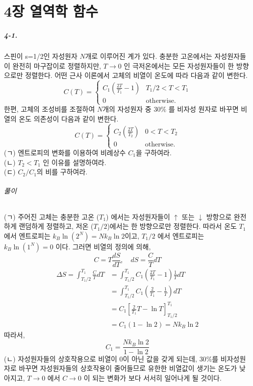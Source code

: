 \documentclass[a4paper,12pt]{report}
\begin{document}
	\chapter*{4장 열역학 함수}
	\paragraph{4-1.} 스핀이 s=1/2인 자성원자 $N$개로 이루어진 계가 있다. 충분한 고온에서는 자성원자들이 완전히 마구잡이로 정렬하지만, $T\rightarrow0$ 인 극저온에서는 모든 자성원자들이 한 방향으로만 정렬한다. 어떤 근사 이론에서 고체의 비열이 온도에 따라 다음과 같이 변한다. 
	$$ C(T)=\begin{cases} C_1\left(\frac{2T}{T_1}-1 \right)&T_1/2<T<T_1\\0 & \mbox{otherwise.}\end{cases}$$
	한편, 고체의 조성비를 조절하여 $N$개의 자성원자 중 $30 \% $ 를 비자성 원자로 바꾸면 비열의 온도 의존성이 다음과 같이 변한다. 
	$$C(T)=\begin{cases}C_2\left( \frac{2T}{T_2}\right)&0<T<T_2 \\0&\mbox{otherwise. }	\end{cases}$$
	(ㄱ) 엔트로피의 변화를 이용하여 비례상수 $C_1$을 구하여라.\\
	(ㄴ) $T_2<T_1$ 인 이유를 설명하여라.\\
	(ㄷ) $C_2/C_1$의 비를 구하여라.
	\subparagraph{풀이}(ㄱ) 주어진 고체는 충분한 고온 ($T_1$) 에서는 자성원자들이 $\uparrow $ 또는 $\downarrow$ 방항으로 완전하게 랜덤하게 정렬하고, 저온 ($T_1/2$)에서는 한 방향으로만 정렬한다. 따라서 온도 $T_1$ 에서 엔트로피는 $k_B\ln(2^N)=Nk_B\ln2$이고, $T_1/2$ 에서 엔트로피는 $k_B\ln(1^N)=0$ 이다. 그러면 비열의 정의에 의해,
	$$C=T\frac{dS}{dT},\quad dS=\frac{C}{T}dT$$
	 \begin{equation}
	\begin{split}
	\Delta S=\int_{T_1/2}^{T_1} \frac{C}{T}dT & = \int_{T_1/2}^{T_1} C_1\left( \frac{2T}{T_1}-1\right) \frac{1}{T}dT \\
	& = \int_{T_1/2}^{T_1} C_1\left( \frac{2}{T_1}-\frac{1}{T}\right)dT\\
	&= C_1\left[\frac{2}{T_1}T-\ln T \right]_{T_1/2}^{T_1} \\
	&= C_1(1-\ln 2)=Nk_B\ln 2
	\end{split}
	\end{equation}
	따라서, 
	$$  C_1=\frac{Nk_B\ln 2}{1-\ln 2}$$
	(ㄴ)  자성원자들의 상호작용으로 비열이 0이 아닌 값을 갖게 되는데, $30\%$를 비자성원자로 바꾸면 자성원자들의 상호작용이 줄어들므로 유한한 비열값이 생기는 온도가 낮아지고, $T\rightarrow0$ 에서 $C\rightarrow0$ 이 되는 변화가 보다 서서히 일어나게 될 것이다. \\
\end{document}
